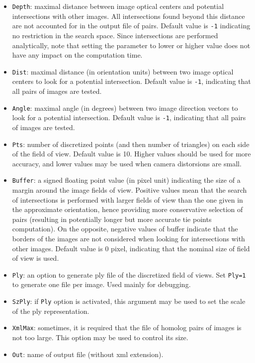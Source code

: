 \begin{itemize}
	\item \texttt{Depth}: maximal distance between image optical centers and potential intersections with other images. All intersections found beyond this distance are not accounted for in the output file of pairs. Default value is \texttt{-1} indicating no restriction in the search space. Since intersections are performed analytically, note that setting the parameter to lower or higher value does not have any impact on the computation time. \newline
	\item \texttt{Dist}: maximal distance (in orientation units) between two image optical centers to look for a potential intersection. Default value is \texttt{-1}, indicating that all pairs of images are tested. \newline
	\item \texttt{Angle}: maximal angle (in degrees) between two image direction vectors to look for a potential intersection. Default value is \texttt{-1}, indicating that all pairs of images are tested. \newline
	\item \texttt{Pts}: number of discretized points (and then number of triangles) on each side of the field of view. Default value is 10. Higher values should be used for more accuracy, and lower values may be used when camera distorsions are small.  \newline
	\item \texttt{Buffer}: a signed floating point value (in pixel unit) indicating the size of a margin around the image fields of view. Positive values mean that the search of intersections is performed with larger fields of view than the one given in the approximate orientation, hence providing more conservative selection of pairs (resulting in potentially longer but more accurate tie points computation). On the opposite, negative values of buffer indicate that the borders of the images are not considered when looking for intersections with other images. Default value is 0 pixel, indicating that the nominal size of field of view is used. \newline
	\item \texttt{Ply}:  an option to generate ply file of the discretized field of views. Set \texttt{Ply=1} to generate one file per image. Used mainly for debugging. \newline
	\item \texttt{SzPly}: if \texttt{Ply} option is activated, this argument may be used to set the scale of the ply representation.  \newline
	\item \texttt{XmlMax}: sometimes, it is required that the file of homolog pairs of images is not too large. This option may be used to control its size.  \newline
	\item \texttt{Out}:  name of output file (without xml extension). \newline 
\end{itemize}


